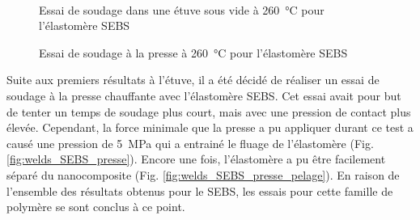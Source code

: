 \begin{figure}[h!]
	\centering
	 \qquad
	 \\
	\caption{Essai de soudage dans une étuve sous vide à \SI{260}{\celsius} pour l'élastomère SEBS}
	\label{fig:etuve_SEBS}
\end{figure}

\FloatBarrier

\begin{figure}[h]
	\centering
	 \qquad
	\caption{Essai de soudage à la presse à \SI{260}{\celsius} pour l'élastomère SEBS}
	\label{fig:presse_SEBS}
\end{figure}

Suite aux premiers résultats à l'étuve, il a été décidé de réaliser un essai de soudage à la presse chauffante avec l'élastomère SEBS. 
Cet essai avait pour but de tenter un temps de soudage plus court, mais avec une pression de contact plus élevée. 
Cependant, la force minimale que la presse a pu appliquer durant ce test a causé une pression de \SI{5}{\mega\pascal} qui a entrainé le fluage de l'élastomère (Fig. \ref{fig:welds_SEBS_presse}). 
Encore une fois, l'élastomère a pu être facilement séparé du nanocomposite (Fig. \ref{fig:welds_SEBS_presse_pelage}). 
En raison de l'ensemble des résultats obtenus pour le SEBS, les essais pour cette famille de polymère se sont conclus à ce point. 

